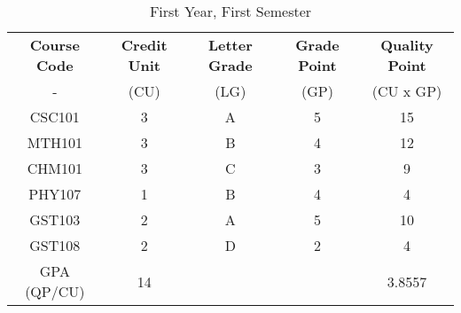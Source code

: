 \documentclass{article}
\begin{document}
	\begin{table}[h!]
		\begin{center}
			\caption{First Year, First Semester}
			\label{tab:table1}
			\begin{tabular}{c|c|c|c|c}
				\textbf{Course Code} & \textbf{Credit Unit} & \textbf{Letter Grade} & \textbf{Grade Point} & \textbf{Quality Point}\\
				- & (CU) & (LG) & (GP) & (CU x GP)\\
				\hline
				CSC101 & 3 & A & 5 & 15\\
				MTH101 & 3 & B & 4 & 12\\
				CHM101 & 3 & C & 3 & 9\\
				PHY107 & 1 & B & 4 & 4\\
				GST103 & 2 & A & 5 & 10\\
				GST108 & 2 & D & 2 & 4\\
				\hline
				GPA (QP/CU) & 14 & & & 3.8557\\
				\hline
			\end{tabular}
		\end{center}
	\end{table}
\end{document}
